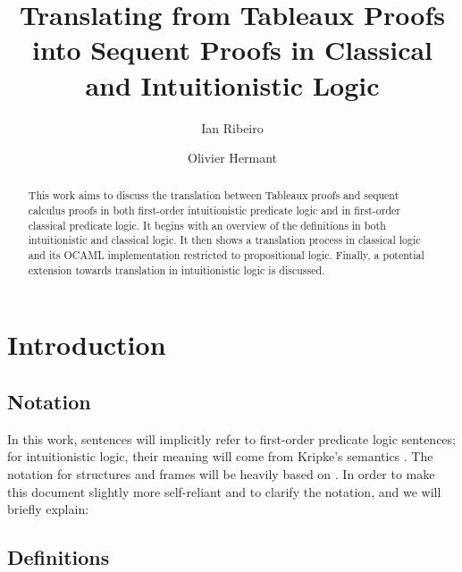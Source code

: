 \documentclass[runningheads]{llncs}
\begin{document}
%
\title{Translating from Tableaux Proofs into Sequent Proofs in Classical and Intuitionistic Logic}
%
%
\author{Ian Ribeiro \and
Olivier Hermant  }
%
%
%
\maketitle              %
%
\begin{abstract}
This work aims to discuss the translation between Tableaux proofs and sequent calculus proofs in both first-order intuitionistic predicate logic and in first-order classical predicate logic.
It begins with an overview of the definitions in both intuitionistic and classical logic.
It then shows a translation process in classical logic and its OCAML implementation restricted to propositional logic. 
Finally, a potential extension towards translation in intuitionistic logic is discussed.
\end{abstract}
%
%
%
\section{Introduction}
\subsection{Notation}



In this work, sentences will implicitly refer to first-order predicate logic sentences; for intuitionistic logic, their meaning will come from Kripke's semantics \cite{kripke1965} . The notation for structures and frames will be heavily based on \cite{book1}. 
In order to make this document slightly more self-reliant and to clarify the notation, and we will briefly explain:
\subsection{Definitions}
\end{document}
